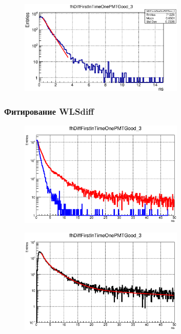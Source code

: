 \begin{figure}[H]
\includegraphics[width=0.7\textwidth]{pictures/WLS_off_fitting.eps}
\caption{}
\label{fig:DirectPhotons}
\end{figure}

\subsubsection{Фитирование WLS\textunderscore diff}

\begin{figure}[H]
\includegraphics[width=0.7\textwidth]{pictures/WLS_curves.eps}
\caption{}
\label{fig:WlsCurves}
\end{figure}

\begin{figure}[H]
\includegraphics[width=0.7\textwidth]{pictures/diff_tripleTauFit_code682_1_1ns.eps}
\caption{}
\label{fig:WlsDiff}
\end{figure}
